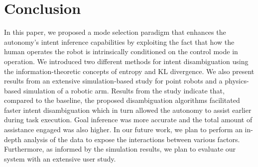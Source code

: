 \documentclass[letterpaper, 10 pt, conference]{ieeeconf}  %
\begin{document}

\section{Conclusion}\label{sec:conclusions}
 In this paper, we proposed a mode selection
paradigm that enhances the autonomy’s intent inference capabilities by exploiting the fact that how the human operates the robot is intrinsically conditioned on
the control mode in operation. We introduced two different methods for intent disambiguation using the information-theoretic concepts of entropy and KL divergence. We also present results from an extensive simulation-based study for point robots and a physics-based simulation of a robotic arm. Results from the study indicate that, compared to the baseline, the proposed disambiguation algorithms facilitated faster intent disambiguation which in turn allowed the autonomy to assist earlier during task execution. Goal inference was more accurate and the total amount of assistance engaged was also higher. In our future work, we plan to perform an in-depth analysis of the data to expose the interactions between various factors. Furthermore, as informed by the simulation results, we plan to evaluate our system with an extensive user study. 


\balance	


\end{document}
